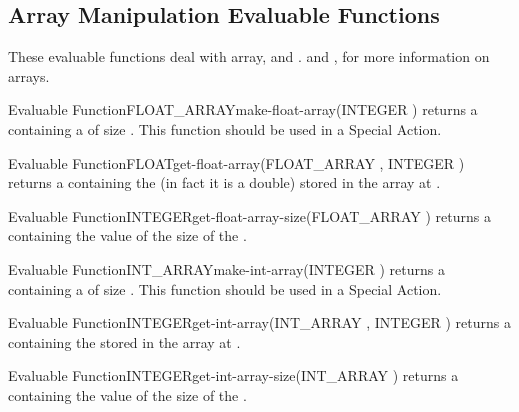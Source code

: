 \subsection{Array Manipulation Evaluable Functions}

These evaluable functions deal with array,  and
.  and , for more information on arrays.

\begin{typeefa}{Evaluable Function}{FLOAT\_ARRAY}{make-float-array}{(INTEGER )}
returns a  containing a  of size .
This function should be used in a Special Action.
\end{typeefa}

\begin{typeefa}{Evaluable Function}{FLOAT}{get-float-array}{(FLOAT\_ARRAY
, INTEGER )}
returns a  containing the   (in fact it is a double)
stored in the array  at  .
\end{typeefa}

\begin{typeefa}{Evaluable Function}{INTEGER}{get-float-array-size}{(FLOAT\_ARRAY
)}
returns a  containing the  value of the size of the
. 
\end{typeefa}

\begin{typeefa}{Evaluable Function}{INT\_ARRAY}{make-int-array}{(INTEGER )}
returns a  containing a  of size .
This function should be used in a Special Action.
\end{typeefa}

\begin{typeefa}{Evaluable Function}{INTEGER}{get-int-array}{(INT\_ARRAY
, INTEGER )}
returns a  containing the   stored in the array
 at  . 
\end{typeefa}

\begin{typeefa}{Evaluable Function}{INTEGER}{get-int-array-size}{(INT\_ARRAY
)}
returns a  containing the  value of the size of
the .
\end{typeefa}

